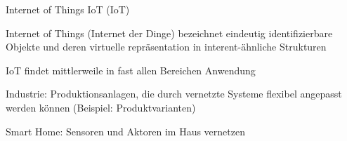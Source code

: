 \begin{notes}
\begin{notes}
    \end{notes}
    \item Internet of Things \gls{IoT} (IoT) 
    \begin{notes}
        \item Internet of Things (Internet der Dinge) bezeichnet eindeutig identifizierbare Objekte und deren virtuelle repräsentation in interent-ähnliche Strukturen\cite{Jie2013} 
        \item IoT findet mittlerweile in fast allen Bereichen Anwendung
        \item Industrie: Produktionsanlagen, die durch vernetzte Systeme flexibel angepasst werden können (Beispiel: Produktvarianten)
        \item Smart Home: Sensoren und Aktoren im Haus vernetzen \cite{Wortmann2015}
    \end{notes}


\end{notes}
